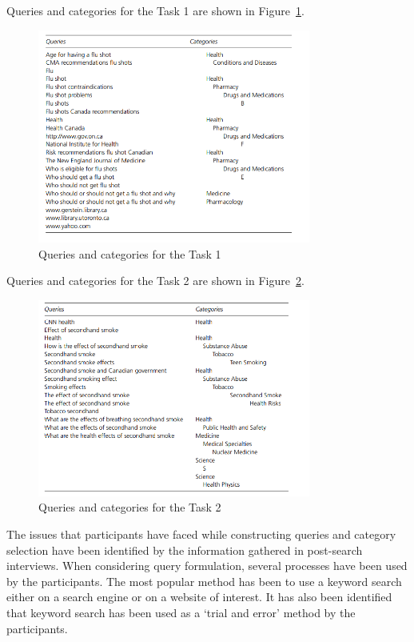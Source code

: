 \documentclass[]{article}
\begin{document}
Queries and categories for the Task 1 are shown in Figure~\ref{fig24}.

\begin{figure}[t!]
	\includegraphics[width=0.8\textwidth]{Capture24.png}
	\caption{ Queries and categories for the Task 1 \label{fig24}}
\end{figure}            

Queries and categories for the Task 2 are shown in Figure~\ref{fig25}.

\begin{figure}[t!]
	\includegraphics[width=0.8\textwidth]{Capture25.png}
	\caption{ Queries and categories for the Task 2 \label{fig25}}
\end{figure}  
    
The issues that participants have faced while constructing queries and category selection have been identified by the information gathered in post-search interviews. When considering query formulation, several processes have been used by the participants. The most popular method has been to use a keyword search either on a search engine or on a website of interest. It has also been identified that keyword search has been used as a ‘trial and error’ method by the participants.       
\end{document}
